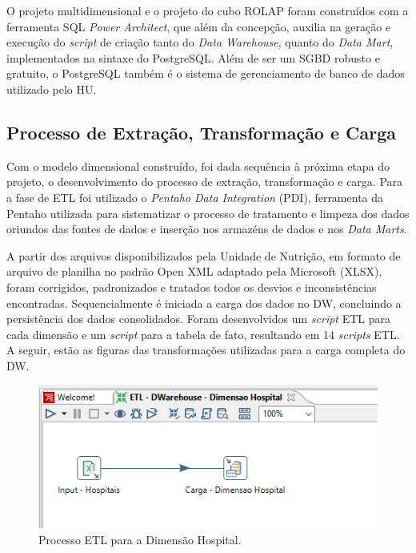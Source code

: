 O projeto multidimensional e o projeto do cubo ROLAP foram construídos com a ferramenta SQL \textit{Power Architect}, que além da concepção, auxilia na geração e execução do \textit{script} de criação tanto do \textit{Data Warehouse}, quanto do \textit{Data Mart}, implementados na sintaxe do PostgreSQL. Além de ser um SGBD robusto e gratuito, o PostgreSQL também é o sistema de gerenciamento de banco de dados utilizado pelo HU. 

\subsection{Processo de Extração, Transformação e Carga}
Com o modelo dimensional construído, foi dada sequência à próxima etapa do projeto, o desenvolvimento do processo de extração, transformação e carga. Para a fase de ETL foi utilizado o \textit{Pentaho Data Integration} (PDI), ferramenta da Pentaho utilizada para sistematizar o processo de tratamento e limpeza dos dados oriundos das fontes de dados e inserção nos armazéns de dados e nos \textit{Data Marts}.

A partir dos arquivos disponibilizados pela Unidade de Nutrição, em formato de arquivo de planilha no padrão Open XML adaptado pela Microsoft (XLSX), foram corrigidos, padronizados e tratados todos os desvios e inconsistências encontradas. Sequencialmente é iniciada a carga dos dados no DW, concluindo a persistência dos dados consolidados. Foram desenvolvidos um \textit{script} ETL para cada dimensão e um \textit{script} para a tabela de fato, resultando em 14 \textit{scripts} ETL. A seguir, estão as figuras das transformações utilizadas para a carga completa do DW. 
\newpage

\begin{figure}[htb]
	\caption{\label{fig_etldimensaohospital}Processo ETL para a Dimensão Hospital.}
	\begin{center}
	    \includegraphics[scale=0.8]{Imagens/figura - etl dw hospital.png}
	\end{center}
\end{figure}

